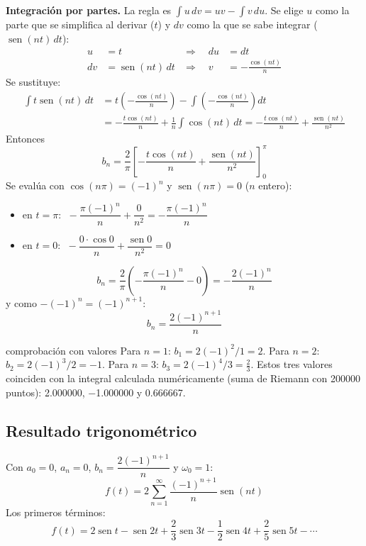\documentclass[11pt,a4paper]{article}
\DeclareMathOperator{\sen}{sen}
\begin{document}
\textbf{Integración por partes.} La regla es $\displaystyle\int u\,dv=uv-\int v\,du$.
Se elige $u$ como la parte que se simplifica al derivar ($t$) y $dv$ como la que se
sabe integrar ($\sen(nt)\,dt$):
\begin{align*}
  u&=t &\Rightarrow\quad du&=dt\\
  dv&=\sen(nt)\,dt &\Rightarrow\quad v&=-\frac{\cos(nt)}{n}
\end{align*}
Se sustituye:
\begin{align*}
  \int t\sen(nt)\,dt
  &=t\left(-\frac{\cos(nt)}{n}\right)-\int\left(-\frac{\cos(nt)}{n}\right)dt\\
  &=-\frac{t\cos(nt)}{n}+\frac{1}{n}\int\cos(nt)\,dt
   =-\frac{t\cos(nt)}{n}+\frac{\sen(nt)}{n^{2}}
\end{align*}
Entonces
\begin{equation*}
  b_n=\frac{2}{\pi}\left[-\frac{t\cos(nt)}{n}+\frac{\sen(nt)}{n^{2}}\right]_{0}^{\pi}
\end{equation*}
Se evalúa con $\cos(n\pi)=(-1)^{n}$ y $\sen(n\pi)=0$ ($n$ entero):
\begin{itemize}
    \item en $t=\pi$: $\;-\dfrac{\pi(-1)^{n}}{n}+\dfrac{0}{n^{2}}=-\dfrac{\pi(-1)^{n}}{n}$
    \item en $t=0$: $\;-\dfrac{0\cdot\cos 0}{n}+\dfrac{\sen 0}{n^{2}}=0$
\end{itemize}
\begin{equation*}
  b_n=\frac{2}{\pi}\left(-\frac{\pi(-1)^{n}}{n}-0\right)=-\frac{2(-1)^{n}}{n}
\end{equation*}
y como $-(-1)^{n}=(-1)^{n+1}$:
\begin{equation*}
  \boxed{b_n=\frac{2(-1)^{n+1}}{n}}
\end{equation*}

\begin{ejemplo}{comprobación con valores}
Para $n=1$: $b_1=2(-1)^{2}/1=2$. Para $n=2$: $b_2=2(-1)^{3}/2=-1$. Para $n=3$:
$b_3=2(-1)^{4}/3=\tfrac{2}{3}$. Estos tres valores coinciden con la integral calculada
numéricamente (suma de Riemann con \num{200000} puntos): \num{2,000000},
\num{-1,000000} y \num{0,666667}.
\end{ejemplo}

\subsection{Resultado trigonométrico}
Con $a_0=0$, $a_n=0$, $b_n=\dfrac{2(-1)^{n+1}}{n}$ y $\omega_0=1$:
\begin{equation*}
  \boxed{f(t)=2\sum_{n=1}^{\infty}\frac{(-1)^{n+1}}{n}\sen(nt)}
\end{equation*}
Los primeros términos:
\begin{equation*}
  f(t)=2\sen t-\sen 2t+\frac{2}{3}\sen 3t-\frac{1}{2}\sen 4t+\frac{2}{5}\sen 5t-\cdots
\end{equation*}
\end{document}

